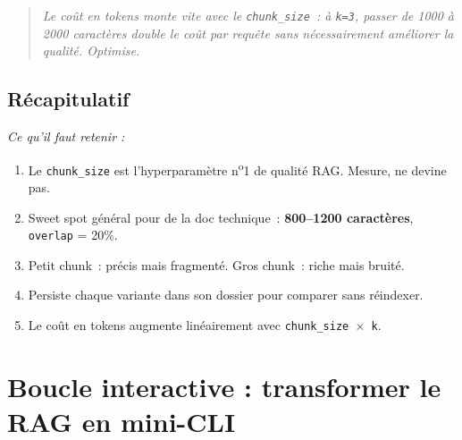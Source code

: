 \documentclass[11pt,a4paper]{article}
\begin{document}
\begin{quote}\itshape
Le coût en tokens monte vite avec le \texttt{chunk\_size}~: à
\texttt{k=3}, passer de 1000 à 2000 caractères double le coût par
requête sans nécessairement améliorer la qualité. Optimise.
\end{quote}

\subsection*{Récapitulatif}
{\itshape\sloppy
\textit{Ce qu'il faut retenir :}
\begin{enumerate}[leftmargin=*]
  \item Le \texttt{chunk\_size} est l'hyperparamètre n\textsuperscript{o}1
        de qualité RAG. Mesure, ne devine pas.
  \item Sweet spot général pour de la doc technique~: \textbf{800--1200
        caractères}, \texttt{overlap} = 20\%.
  \item Petit chunk~: précis mais fragmenté. Gros chunk~: riche mais
        bruité.
  \item Persiste chaque variante dans son dossier pour comparer sans
        réindexer.
  \item Le coût en tokens augmente linéairement avec \texttt{chunk\_size
        \(\times\) k}.
\end{enumerate}
\par}

\section{Boucle interactive : transformer le RAG en mini-CLI}
\end{document}
